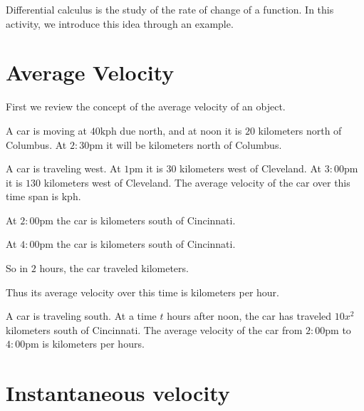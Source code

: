 \documentclass{ximera}
\begin{document}
Differential calculus is the study of the rate of change of a function.  In this activity, we introduce this idea through an example.

\section{Average Velocity}

First we review the concept of the average velocity of an object.

\begin{question}
	A car is moving at $40 \textrm{kph}$ due north,  and at noon it is $20$ kilometers north of Columbus.  At $2:30 \textrm{pm}$ it will be  kilometers north of Columbus.
\end{question}

\begin{question}
	A car is traveling west.  At $1 \textrm{pm}$ it is $30$ kilometers west of Cleveland.  At $3:00 \textrm{pm}$ it is $130$ kilometers west of Cleveland.  The average velocity of the car over this time span is  $\textrm{kph}$. 
\end{question}

\begin{question}
	\begin{hint}
		\begin{question}
			At $2:00 \textrm{pm}$ the car is  kilometers south of Cincinnati.
		\end{question}
		\begin{question}
			At $4:00 \textrm{pm}$ the car is  kilometers south of Cincinnati.
		\end{question}
		\begin{question}
			So in $2$ hours, the car traveled  kilometers.
		\end{question}
		\begin{question}
			Thus its average velocity over this time is  kilometers per hour.
\end{question}
		
	\end{hint}
	A car is traveling south.  At a time $t$ hours after noon, the car has traveled $10x^2$ kilometers south of Cincinnati.  The average velocity of the car from $2:00 \textrm{pm}$ to $4:00 \textrm{pm}$ is  kilometers per hours.
\end{question}

\section{Instantaneous velocity }
\end{document}
